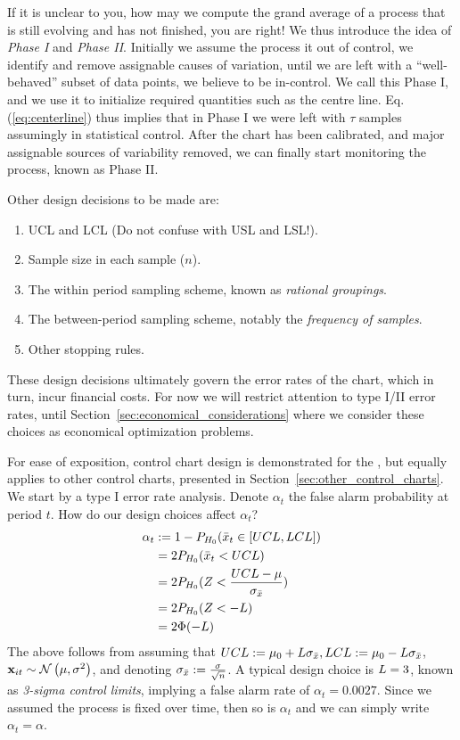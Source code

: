 If it is unclear to you, how may we compute the grand average of a process that is still evolving and has not finished, you are right! We thus introduce the idea of \emph{Phase I} and \emph{Phase II}. 
Initially we assume the process it out of control, we identify and remove assignable causes of variation, until we are left with a ``well-behaved'' subset of data points, we believe to be in-control. We call this Phase I, and we use it to initialize required quantities such as the centre line. 
Eq.(\ref{eq:centerline}) thus implies that in Phase I we were left with $\tau$ samples assumingly in statistical control.
After the chart has been calibrated, and major assignable sources of variability removed, we can finally start monitoring the process, known as Phase II.



Other design decisions to be made are:
\begin{enumerate}
\item UCL and LCL (Do not confuse with USL and LSL!).
\item Sample size in each sample ($n$).
\item The within period sampling scheme, known as \emph{rational groupings}.
\item The between-period sampling scheme, notably the \emph{frequency of samples}. 
\item Other stopping rules.
\end{enumerate}
These design decisions ultimately govern the error rates of the chart, which in turn, incur financial costs. 
For now we will restrict attention to type I/II error rates, until Section~\ref{sec:economical_considerations} where we consider these choices as economical optimization problems.

For ease of exposition, control chart design is demonstrated for the \barxChart, but equally applies to other control charts, presented in Section~\ref{sec:other_control_charts}.
We start by a type I error rate analysis. 
Denote $\alpha_t$ the false alarm probability at period $t$.
How do our design choices affect $\alpha_t$?
\begin{align}
	\alpha_t &:= 1-P_{H_0}(\bar{x}_t \in [UCL,LCL]) \\
	&= 2 P_{H_0}(\bar{x}_t<UCL) \\
	&= 2 P_{H_0}(Z<\frac{UCL-\mu}{\sigma_{\bar{x}}}) \\
	&= 2 P_{H_0}(Z < -L) \\
	&= 2 \Phi(-L)
\end{align}
The above follows from assuming that $UCL:=\mu_0 + L \sigma_{\bar{x}}, LCL:= \mu_0 - L \sigma_{\bar{x}}$, $\mathbf{x}_{it}\sim \mathcal{N}\left(\mu,\sigma^2\right)$, and denoting $\sigma_{\bar{x}}:= \frac{\sigma}{\sqrt{n}}$.
A typical design choice is $L=3$, known as \emph{3-sigma control limits}, implying a false alarm rate of $\alpha_t=0.0027$.
Since we assumed the process is fixed over time, then so is $\alpha_t$ and we can simply write $\alpha_t=\alpha$.

